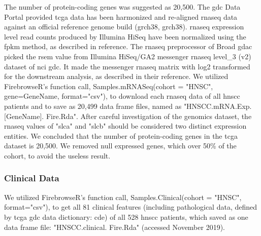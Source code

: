 \documentclass[jpm,article,submit,moreauthors,pdftex]{Definitions/mdpi}
\begin{document}
\begin{paracol}{2}
The number of protein-coding genes was suggested as 20,500\cite{Clamp2007}. The \acrshort{gdc} Data Portal provided \acrshort{tcga} data has been harmonized and re-aligned \acrlong{rnaseq} data against an official reference genome build (\acrlong{grch38}, \acrshort{grch38}). \acrshort{rnaseq} expression level read counts produced by Illumina HiSeq have been normalized using the \acrfull{fpkm} method, as described in reference\cite{FPKM2017}.
The \acrshort{rnaseq} preprocessor of Broad \acrshort{gdac} picked the \acrfull{rsem} value from Illumina HiSeq/GA2 messenger \acrshort{rnaseq} level\_3 (v2) dataset of \acrshort{nci} \acrshort{gdc}. It made the messenger \acrshort{rnaseq} matrix with log2 transformed for the downstream analysis, as described in their reference\cite{RSEM2016}.
We utilized FirebrowseR's function call, Samples.mRNASeq(cohort = "HNSC", gene=GeneName, format="csv"), to download each \acrshort{rnaseq} data of all \acrshort{hnscc} patients and to save as 20,499 data frame files, named as "HNSCC.mRNA.Exp.[GeneName].\newline
Fire.Rda".
After careful investigation of the genomics dataset, the \acrshort{rnaseq} values of "\acrfull{slca}" and "\acrfull{slcb}" should be considered two distinct expression entities. We concluded that the number of protein-coding genes in the \acrshort{tcga} dataset is 20,500. We removed null expressed genes, which over 50\% of the cohort, to avoid the useless result.

\subsubsection{Clinical Data} 

We utilized FirebrowseR's function call, Samples.Clinical(cohort = "HNSC", format="csv"), to get all 81 clinical features (including pathological data, defined by \acrshort{tcga} \acrshort{gdc} data dictionary: \acrfull{cde}\cite{CDE2019}) of all 528 \acrshort{hnscc} patients, which saved as one data frame file: "HNSCC.clinical.\linebreak
Fire.Rda" (accessed November 2019).


\end{paracol}
\end{document}

